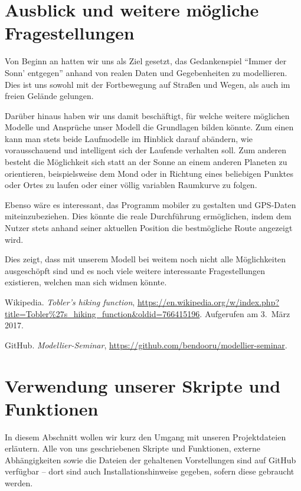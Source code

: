 \documentclass[
    paper=a4,
    DIV14,
    fontsize=12pt,
    pagesize=pdftex,
    toc=bibliographynumbered
]{scrartcl}
\numberwithin{figure}{section}
\numberwithin{equation}{section}
\numberwithin{table}{section}
\begin{document}
\section{Ausblick und weitere mögliche Fragestellungen}

Von Beginn an hatten wir uns als Ziel gesetzt, das Gedankenspiel \enquote{Immer der Sonn'
entgegen} anhand von realen Daten und Gegebenheiten zu modellieren. Dies ist uns sowohl
mit der Fortbewegung auf Straßen und Wegen, als auch im freien Gelände gelungen.

Darüber hinaus haben wir uns damit beschäftigt, für welche weitere möglichen Modelle und
Ansprüche unser Modell die Grundlagen bilden könnte. Zum einen kann man stets beide
Laufmodelle im Hinblick darauf abändern, wie vorausschauend und intelligent sich der
Laufende verhalten soll. Zum anderen besteht die Möglichkeit sich statt an der Sonne an
einem anderen Planeten zu orientieren, beispielsweise dem Mond oder in Richtung eines
beliebigen Punktes oder Ortes zu laufen oder einer völlig variablen Raumkurve zu folgen.

Ebenso wäre es interessant, das Programm mobiler zu gestalten und GPS-Daten
miteinzubeziehen. Dies könnte die reale Durchführung ermöglichen, indem dem Nutzer stets
anhand seiner aktuellen Position die bestmögliche Route angezeigt wird.

Dies zeigt, dass mit unserem Modell bei weitem noch nicht alle Möglichkeiten ausgeschöpft
sind und es noch viele weitere interessante Fragestellungen existieren, welchen man sich
widmen könnte.

\begin{thebibliography}{3}
        Wikipedia.
        \emph{Tobler's hiking function},
        \url{https://en.wikipedia.org/w/index.php?title=Tobler%27s_hiking_function&oldid=766415196}.
        Aufgerufen am 3.\ März 2017.

        GitHub. \emph{Modellier-Seminar},
        \url{https://github.com/bendooru/modellier-seminar}.
\end{thebibliography}

\appendix
\section{Verwendung unserer Skripte und Funktionen}
In diesem Abschnitt wollen wir kurz den Umgang mit unseren Projektdateien erläutern.
Alle von uns geschriebenen Skripte und Funktionen, externe Abhängigkeiten sowie die
Dateien der gehaltenen Vorstellungen sind auf GitHub\cite{git:modsemi} verfügbar -- dort
sind auch Installationshinweise gegeben, sofern diese gebraucht werden.
\end{document}

